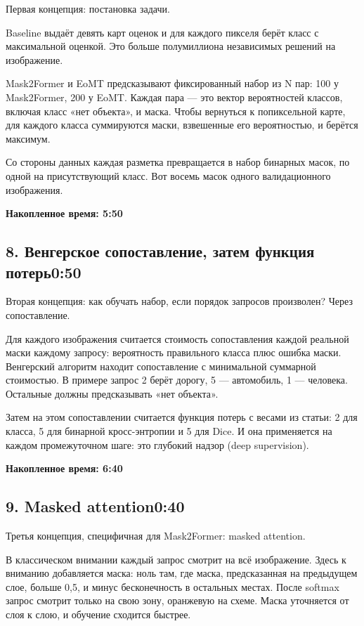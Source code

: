 \documentclass[11pt,a4paper]{article}
\newcommand{\cumul}[1]{\par{\hfill\small\color{accent}\bfseries #1}\par}
\newcommand{\tempo}[1]{\hfill{\normalsize\color{accent}#1}}
\begin{document}
Первая концепция: постановка задачи.

Baseline выдаёт девять карт оценок и для каждого пикселя берёт класс с максимальной оценкой. Это больше полумиллиона независимых решений на изображение.

Mask2Former и EoMT предсказывают фиксированный набор из N пар: 100 у Mask2Former, 200 у EoMT. Каждая пара — это вектор вероятностей классов, включая класс «нет объекта», и маска. Чтобы вернуться к попиксельной карте, для каждого класса суммируются маски, взвешенные его вероятностью, и берётся максимум.

Со стороны данных каждая разметка превращается в набор бинарных масок, по одной на присутствующий класс. Вот восемь масок одного валидационного изображения.

\cumul{Накопленное время: 5:50}

\subsection*{8. Венгерское сопоставление, затем функция потерь\tempo{0:50}}

Вторая концепция: как обучать набор, если порядок запросов произволен? Через сопоставление.

Для каждого изображения считается стоимость сопоставления каждой реальной маски каждому запросу: вероятность правильного класса плюс ошибка маски. Венгерский алгоритм находит сопоставление с минимальной суммарной стоимостью. В примере запрос 2 берёт дорогу, 5 — автомобиль, 1 — человека. Остальные должны предсказывать «нет объекта».

Затем на этом сопоставлении считается функция потерь с весами из статьи: 2 для класса, 5 для бинарной кросс-энтропии и 5 для Dice. И она применяется на каждом промежуточном шаге: это глубокий надзор (deep supervision).

\cumul{Накопленное время: 6:40}

\subsection*{9. Masked attention\tempo{0:40}}

Третья концепция, специфичная для Mask2Former: masked attention.

В классическом внимании каждый запрос смотрит на всё изображение. Здесь к вниманию добавляется маска: ноль там, где маска, предсказанная на предыдущем слое, больше 0,5, и минус бесконечность в остальных местах. После softmax запрос смотрит только на свою зону, оранжевую на схеме. Маска уточняется от слоя к слою, и обучение сходится быстрее.
\end{document}
